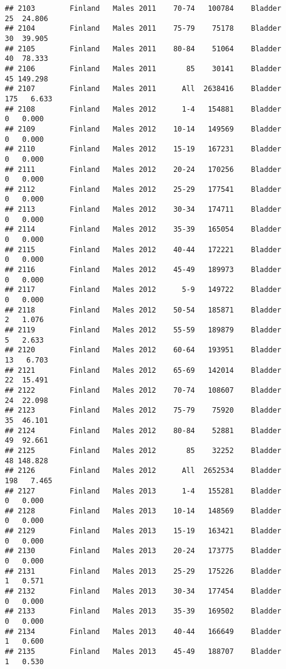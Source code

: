 \documentclass[
]{article}
\begin{document}
\begin{verbatim}
## 2103        Finland   Males 2011    70-74   100784    Bladder     25  24.806
## 2104        Finland   Males 2011    75-79    75178    Bladder     30  39.905
## 2105        Finland   Males 2011    80-84    51064    Bladder     40  78.333
## 2106        Finland   Males 2011       85    30141    Bladder     45 149.298
## 2107        Finland   Males 2011      All  2638416    Bladder    175   6.633
## 2108        Finland   Males 2012      1-4   154881    Bladder      0   0.000
## 2109        Finland   Males 2012    10-14   149569    Bladder      0   0.000
## 2110        Finland   Males 2012    15-19   167231    Bladder      0   0.000
## 2111        Finland   Males 2012    20-24   170256    Bladder      0   0.000
## 2112        Finland   Males 2012    25-29   177541    Bladder      0   0.000
## 2113        Finland   Males 2012    30-34   174711    Bladder      0   0.000
## 2114        Finland   Males 2012    35-39   165054    Bladder      0   0.000
## 2115        Finland   Males 2012    40-44   172221    Bladder      0   0.000
## 2116        Finland   Males 2012    45-49   189973    Bladder      0   0.000
## 2117        Finland   Males 2012      5-9   149722    Bladder      0   0.000
## 2118        Finland   Males 2012    50-54   185871    Bladder      2   1.076
## 2119        Finland   Males 2012    55-59   189879    Bladder      5   2.633
## 2120        Finland   Males 2012    60-64   193951    Bladder     13   6.703
## 2121        Finland   Males 2012    65-69   142014    Bladder     22  15.491
## 2122        Finland   Males 2012    70-74   108607    Bladder     24  22.098
## 2123        Finland   Males 2012    75-79    75920    Bladder     35  46.101
## 2124        Finland   Males 2012    80-84    52881    Bladder     49  92.661
## 2125        Finland   Males 2012       85    32252    Bladder     48 148.828
## 2126        Finland   Males 2012      All  2652534    Bladder    198   7.465
## 2127        Finland   Males 2013      1-4   155281    Bladder      0   0.000
## 2128        Finland   Males 2013    10-14   148569    Bladder      0   0.000
## 2129        Finland   Males 2013    15-19   163421    Bladder      0   0.000
## 2130        Finland   Males 2013    20-24   173775    Bladder      0   0.000
## 2131        Finland   Males 2013    25-29   175226    Bladder      1   0.571
## 2132        Finland   Males 2013    30-34   177454    Bladder      0   0.000
## 2133        Finland   Males 2013    35-39   169502    Bladder      0   0.000
## 2134        Finland   Males 2013    40-44   166649    Bladder      1   0.600
## 2135        Finland   Males 2013    45-49   188707    Bladder      1   0.530

\end{verbatim}
\end{document}
